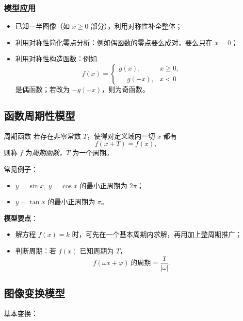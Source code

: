 \documentclass[a4paper,11pt]{ctexart}
\begin{document}
\subsubsection{模型应用}

\begin{itemize}
  \item 已知一半图像（如 $x\ge0$ 部分），利用对称性补全整体；
  \item 利用对称性简化零点分析：例如偶函数的零点要么成对，要么只在 $x=0$；
  \item 利用对称性构造函数：例如
    \[
      f(x)=
      \begin{cases}
        g(x), & x\ge0,\\
        \phantom{-}g(-x), & x<0
      \end{cases}
    \]
    是偶函数；若改为 $-g(-x)$，则为奇函数。
\end{itemize}

\subsection{函数周期性模型}

\begin{definitionbox}{周期函数}
  若存在非零常数 $T$，使得对定义域内一切 $x$ 都有
  \[
    f(x+T)=f(x),
  \]
  则称 $f$ 为\emph{周期函数}，$T$ 为一个周期。
\end{definitionbox}

常见例子：

\begin{itemize}
  \item $y=\sin x,\ y=\cos x$ 的最小正周期为 $2\pi$；
  \item $y=\tan x$ 的最小正周期为 $\pi$。
\end{itemize}

\textbf{模型要点}：

\begin{itemize}
  \item 解方程 $f(x)=k$ 时，可先在一个基本周期内求解，再用加上整周期推广；
  \item 判断周期：若 $f(x)$ 已知周期为 $T$，
    \[
      f(\omega x+\varphi)\ \text{的周期} = \frac{T}{|\omega|}.
    \]
\end{itemize}

\subsection{图像变换模型}

基本变换：
\end{document}
